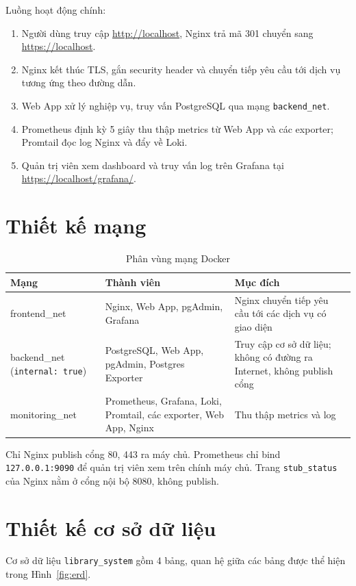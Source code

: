 \documentclass[../main.tex]{subfiles}
\begin{document}
Luồng hoạt động chính:
\begin{enumerate}
    \item Người dùng truy cập \url{http://localhost}, Nginx trả mã 301 chuyển sang \url{https://localhost}.
    \item Nginx kết thúc TLS, gắn security header và chuyển tiếp yêu cầu tới dịch vụ tương ứng theo đường dẫn.
    \item Web App xử lý nghiệp vụ, truy vấn PostgreSQL qua mạng \texttt{backend\_net}.
    \item Prometheus định kỳ 5 giây thu thập metrics từ Web App và các exporter; Promtail đọc log Nginx và đẩy về Loki.
    \item Quản trị viên xem dashboard và truy vấn log trên Grafana tại \url{https://localhost/grafana/}.
\end{enumerate}

\section{Thiết kế mạng}
\begin{table}[H]
\centering
\caption{Phân vùng mạng Docker}
\label{tab:mang}
\begin{tabular}{|p{3cm}|p{5.8cm}|p{5cm}|}
\hline
\textbf{Mạng} & \textbf{Thành viên} & \textbf{Mục đích} \\
\hline
frontend\_net & Nginx, Web App, pgAdmin, Grafana & Nginx chuyển tiếp yêu cầu tới các dịch vụ có giao diện \\ \hline
backend\_net (\texttt{internal: true}) & PostgreSQL, Web App, pgAdmin, Postgres Exporter & Truy cập cơ sở dữ liệu; không có đường ra Internet, không publish cổng \\ \hline
monitoring\_net & Prometheus, Grafana, Loki, Promtail, các exporter, Web App, Nginx & Thu thập metrics và log \\ \hline
\end{tabular}
\end{table}

Chỉ Nginx publish cổng 80, 443 ra máy chủ. Prometheus chỉ bind \texttt{127.0.0.1:9090} để quản trị viên xem trên chính máy chủ. Trang \texttt{stub\_status} của Nginx nằm ở cổng nội bộ 8080, không publish.

\section{Thiết kế cơ sở dữ liệu}
Cơ sở dữ liệu \texttt{library\_system} gồm 4 bảng, quan hệ giữa các bảng được thể hiện trong Hình~\ref{fig:erd}.
\end{document}
